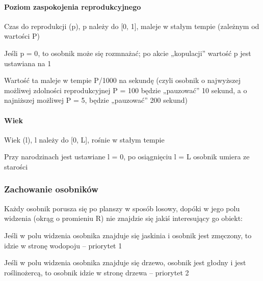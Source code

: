 \paragraph*{Poziom zaspokojenia reprodukcyjnego}

Czas do reprodukcji (p), p należy do \mbox{[}0, 1\mbox{]}, maleje w stałym tempie (zależnym od wartości P)


\begin{DoxyItemize}
\item Jeśli {\ttfamily p = 0}, to osobnik może się rozmnażać; po akcie „kopulacji” wartość {\ttfamily p} jest ustawiana na 1
\end{DoxyItemize}


\begin{DoxyItemize}
\item Wartość ta maleje w tempie {\ttfamily P/1000} na sekundę (czyli osobnik o najwyższej możliwej zdolności reprodukcyjnej {\ttfamily P = 100} będzie „pauzować” 10 sekund, a o najniższej możliwej {\ttfamily P = 5}, będzie „pauzować” 200 sekund)
\end{DoxyItemize}

\paragraph*{Wiek}

Wiek (l), l należy do \mbox{[}0, L\mbox{]}, rośnie w stałym tempie


\begin{DoxyItemize}
\item Przy narodzinach jest ustawiane {\ttfamily l = 0}, po osiągnięciu {\ttfamily l = L} osobnik umiera ze starości
\end{DoxyItemize}

\subsubsection*{Zachowanie osobników}

Każdy osobnik porusza się po planszy w sposób losowy, dopóki w jego polu widzenia (okrąg o promieniu R) nie znajdzie się jakiś interesujący go obiekt\-:


\begin{DoxyItemize}
\item Jeśli w polu widzenia osobnika znajduje się jaskinia i osobnik jest zmęczony, to idzie w stronę wodopoju – priorytet 1
\end{DoxyItemize}


\begin{DoxyItemize}
\item Jeśli w polu widzenia osobnika znajduje się drzewo, osobnik jest głodny i jest roślinożercą, to osobnik idzie w stronę drzewa – priorytet 2
\end{DoxyItemize}


